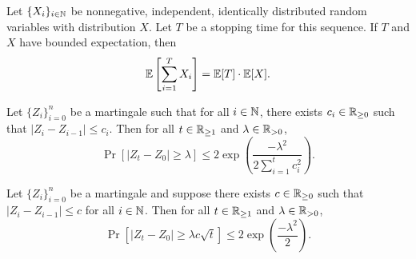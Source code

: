 \begin{theorem}
    Let $\{X_i\}_{i \in \mathbb N}$ be nonnegative, independent, identically distributed random variables with distribution $X$. Let $T$ be a stopping time for this sequence. If $T$ and $X$ have bounded expectation, then
    \[ \mathbb E\left[\sum_{i=1}^T X_i\right] = \mathbb E[T] \cdot \mathbb E[X]. \]
\end{theorem}

\begin{theorem}
    Let $\{Z_i\}_{i=0}^n$ be a martingale such that for all $i \in \mathbb N$, there exists $c_i \in \mathbb R_{\geq 0}$ such that $\lvert Z_i - Z_{i-1} \rvert \leq c_i$. Then for all $t \in \mathbb R_{\geq 1}$ and $\lambda \in \mathbb R_{> 0}$,
    \[ \Pr[\lvert Z_t - Z_0 \rvert \geq \lambda] \leq 2 \exp\left(\frac{-\lambda^2}{2\sum_{i=1}^t c_i^2}\right).\]
\end{theorem}

\begin{corollary}
    Let $\{Z_i\}_{i=0}^n$ be a martingale and suppose there exists $c \in \mathbb R_{\geq 0}$ such that $\lvert Z_i - Z_{i-1} \rvert \leq c$ for all $i \in \mathbb N$. Then for all $t \in \mathbb R_{\geq 1}$ and $\lambda \in \mathbb R_{> 0}$,
    \[ \Pr[\lvert Z_t - Z_0 \rvert \geq \lambda c \sqrt t] \leq 2 \exp\left(\frac{-\lambda^2}{2}\right).\]
\end{corollary}